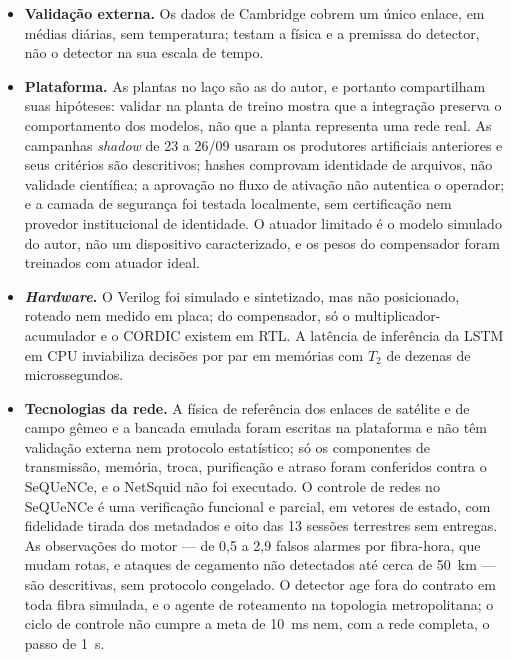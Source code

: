 \documentclass[12pt]{article}
\begin{document}
\begin{itemize}
        acentuados, magnitude inferior à adotada aqui.
  \item \textbf{Validação externa.} Os dados de Cambridge cobrem um único enlace,
        em médias diárias, sem temperatura; testam a física e a premissa do
        detector, não o detector na sua escala de tempo.
  \item \textbf{Plataforma.} As plantas no laço são as do autor, e portanto
        compartilham suas hipóteses: validar na planta de treino mostra que a
        integração preserva o comportamento dos modelos, não que a planta
        representa uma rede real. As campanhas \textit{shadow} de 23 a 26/09
        usaram os produtores artificiais anteriores e seus critérios são
        descritivos; hashes comprovam identidade de arquivos, não validade
        científica; a aprovação no fluxo de ativação não autentica o operador; e
        a camada de segurança foi testada localmente, sem certificação nem
        provedor institucional de identidade. O atuador limitado é o modelo simulado do autor, não um
        dispositivo caracterizado, e os pesos do compensador foram treinados
        com atuador ideal.
  \item \textbf{\textit{Hardware}.} O Verilog foi simulado e sintetizado, mas
        não posicionado, roteado nem medido em placa; do compensador, só o
        multiplicador-acumulador e o CORDIC existem em RTL. A latência de
        inferência da LSTM em CPU inviabiliza decisões por par em memórias com
        $T_2$ de dezenas de microssegundos.
  \item \textbf{Tecnologias da rede.} A física de referência dos enlaces de
        satélite e de campo gêmeo e a bancada emulada foram escritas na
        plataforma e não têm validação externa nem protocolo estatístico; só os
        componentes de transmissão, memória, troca, purificação e atraso foram
        conferidos contra o SeQUeNCe, e o NetSquid \cite{coopmans2021} não foi
        executado. O controle de redes no SeQUeNCe é uma verificação funcional
        e parcial, em vetores de estado, com fidelidade tirada dos metadados e
        oito das 13 sessões terrestres sem entregas. As observações do motor
        --- de 0,5 a 2,9 falsos alarmes por
        fibra-hora, que mudam rotas, e ataques de cegamento não detectados até
        cerca de 50~km --- são descritivas, sem protocolo congelado. O detector
        age fora do contrato em toda fibra simulada, e o agente de roteamento na
        topologia metropolitana; o ciclo de controle não cumpre a meta de 10~ms
        nem, com a rede completa, o passo de 1~s.
\end{itemize}
\end{document}
